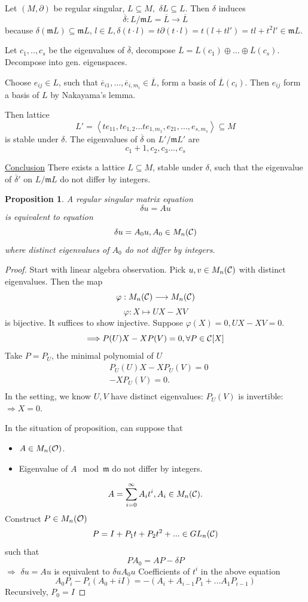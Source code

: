 \documentclass[11pt]{article}
\newtheorem{prop}[thm]{Proposition}
\newcommand{\pd}{\partial}
\newcommand{\scm}{{\mathfrak m}}
\newcommand{\calc}{{\cal C}}
\newcommand{\calo}{{\cal O}}
\newcommand{\Lrta}{\Longrightarrow}
\newcommand{\lrta}{\longrightarrow}
\newcommand{\lgl}{\langle}
\newcommand{\rgl}{\rangle}
\begin{document}
Let $(M,\pd)$ be regular singular, $L\subseteq M,$ $\delta L\subseteq L$. Then $\delta$ induces 
$$
\overline{\delta}:L/\scm L=\overline{L}\lrta \overline{L}
$$
because $\delta(\scm L)\subseteq \scm L$, $l\in L,\delta (t\cdot l)=t\pd(t\cdot l)=t(l+t l')=tl+t^2 l'\in\scm L$.

Let $c_1,..,c_s$ be the eigenvalues of $\overline{\delta}$, decompose $\overline{L}=\overline{L}(c_1)\oplus...\oplus \overline{L}(c_s)$. Decompose into gen. eigenspaces.

Choose $e_{ij}\in L$, such that $\overline{e}_{i1},...,\overline{e}_{i,m_i}\in\overline{L}$, form a basis of $\overline{L}(c_i)$. Then $e_{ij}$ form a basis of $L$ by Nakayama's lemma.

Then lattice
$$
L'=
\left\lgl t e_{11}, t e_{1,2}...t e_{1,m_1},e_{21},...,e_{s,m_s}\right\rgl\subseteq M
$$
is stable under $\delta.$ The eigenvalues of $\overline{\delta}$ on $L'/\scm L'$ are 
$$
c_1+1,c_2,c_3...,c_s
$$

\underline{Conclusion} There exists a lattice $L\subseteq M$, stable under $\delta$, such that the eigenvalue of $\overline{\delta}'$ on $L/\scm L$ do not differ by integers.

\begin{prop}
A regular singular matrix equation 
$$
\delta u= Au
$$
is equivalent to equation 
$$
\delta u= A_0 u, A_0\in M_n(\calc)
$$ 
where distinct eigenvalues of $A_0$ do not differ by integers.
\end{prop}
\begin{proof}
Start with linear algebra observation. Pick $u,v\in M_n(\calc)$ with distinct eigenvalues. Then the map 
$$
\varphi:
M_n(\calc)\lrta M_n(\calc)
$$
$$
\varphi:X\longmapsto UX- X V
$$
is bijective. It suffices to show injective. Suppose $\varphi(X)=0, UX-XV=0$.
$$
\Lrta P(U)X-XP(V)=0, \forall P\in\calc[X]
$$
Take $P=P_U$, the minimal polynomial of $U$
$$
\begin{aligned}
&P_U(U)X-XP_U(V)=0\\
&-XP_U(V)=0.\\
\end{aligned}
$$
In the setting, we know $U,V$ have distinct eigenvalues: $P_U(V)$ is invertible: $\Lrta X=0$.

In the situation of proposition, can suppose that 
\begin{itemize}
\item $A\in M_n(\calo)$. 
\item Eigenvalue of $A\mod \scm$ do not differ by integers.
\end{itemize}
$$
A=\sum^\infty_{i=0}A_i t^i, A_i\in M_n(\calc).
$$
Construct $P\in M_n(\calo)$
$$
P=I+P_1 t+ P_2 t^2+...\in GL_n(\calc)
$$
such that 
$$
PA_0=AP-\delta P
$$
$\Lrta$ $\delta u= A u$ is equivalent to $\delta u A_0 u$
Coefficients of $t^i $ in the above equation
$$
A_0 P_i-P_i(A_0+i I)=-(A_i+A_{i-1}P_1+...A_1 P_{i-1})
$$ 
Recursively, $P_0=I$
\end{proof}
\end{document}
